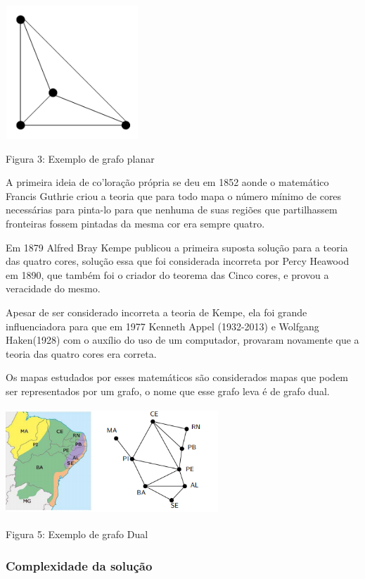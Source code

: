 \documentclass[12pt]{article}
\begin{document}
    {\centering  \includegraphics[width=5cm,height=5cm]{grafoPlanar}\par} 
    
     Figura 3:  Exemplo de grafo planar
     
    A primeira ideia de co'loração própria se deu em 1852 aonde o matemático Francis Guthrie criou a teoria que para todo mapa o número mínimo de cores necessárias para pinta-lo para que nenhuma de suas regiões que partilhassem fronteiras fossem pintadas da mesma cor era sempre quatro.
    
   
    Em 1879 Alfred Bray Kempe publicou a primeira suposta solução para a teoria das quatro cores, solução essa que foi considerada incorreta por Percy Heawood em 1890, que também foi o criador do teorema das Cinco cores, e provou a veracidade do mesmo.
    
    Apesar de ser considerado incorreta a teoria de Kempe, ela foi grande influenciadora para que em 1977 Kenneth Appel (1932-2013) e Wolfgang Haken(1928) com o auxílio do uso de um computador, provaram novamente que a teoria das quatro cores era correta.
    
    Os mapas estudados por esses matemáticos são considerados mapas que podem ser representados por um grafo, o nome que esse grafo leva é de grafo dual. 
    
     {\centering  \includegraphics[width=8cm,height=4cm]{grafoDual}\par}
   	
   	Figura 5: Exemplo de grafo Dual
   	
   	\subsubsection{Complexidade da solução}
   	
\end{document}
